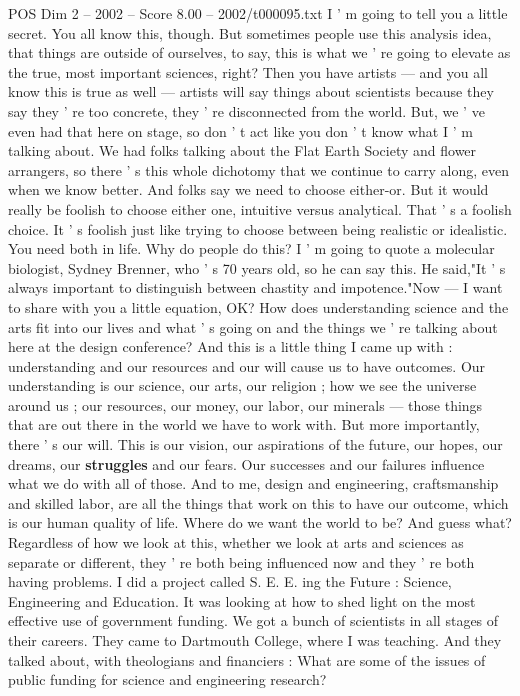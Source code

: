 \begin{textsample}{POS Dim 2 – 2002 – Score 8.00 – 2002/t000095.txt}
I ' m going to tell you a little secret.
You all know this, though.
But sometimes people use this analysis idea, that things are outside of ourselves, to say, this is what we ' re going to elevate as the true, most important sciences, right?
Then you have artists — and you all know this is true as well — artists will say things about scientists because they say they ' re too concrete, they ' re disconnected from the world.
But, we ' ve even had that here on stage, so don ' t act like you don ' t know what I ' m talking about.
We had folks talking about the Flat Earth Society and flower arrangers, so there ' s this whole dichotomy that we continue to carry along, even when we know better.
And folks say we need to choose either-or.
But it would really be foolish to choose either one, intuitive versus analytical.
That ' s a foolish choice.
It ' s foolish just like trying to choose between being realistic or idealistic.
You need both in life.
Why do people do this?
I ' m going to quote a molecular biologist, Sydney Brenner, who ' s 70 years old, so he can say this.
He said,"It ' s always important to distinguish between chastity and impotence."Now — I want to share with you a little equation, OK?
How does understanding science and the arts fit into our lives and what ' s going on and the things we ' re talking about here at the design conference?
And this is a little thing I came up with : understanding and our resources and our will cause us to have outcomes.
Our understanding is our science, our arts, our religion ; how we see the universe around us ; our resources, our money, our labor, our minerals — those things that are out there in the world we have to work with.
But more importantly, there ' s our will.
This is our vision, our aspirations of the future, our hopes, our dreams, our \textbf{struggles} and our fears.
Our successes and our failures influence what we do with all of those.
And to me, design and engineering, craftsmanship and skilled labor, are all the things that work on this to have our outcome, which is our human quality of life.
Where do we want the world to be?
And guess what?
Regardless of how we look at this, whether we look at arts and sciences as separate or different, they ' re both being influenced now and they ' re both having problems.
I did a project called S.
E.
E. ing the Future : Science, Engineering and Education.
It was looking at how to shed light on the most effective use of government funding.
We got a bunch of scientists in all stages of their careers.
They came to Dartmouth College, where I was teaching.
And they talked about, with theologians and financiers : What are some of the issues of public funding for science and engineering research?

\end{textsample}
